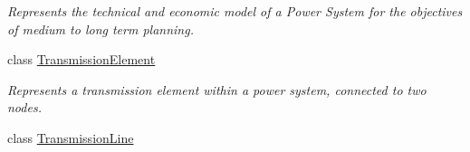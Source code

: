 \begin{DoxyCompactItemize}
\begin{DoxyCompactList}\small\item\em Represents the technical and economic model of a Power System for the objectives of medium to long term planning. \end{DoxyCompactList}\item 
class \hyperlink{class_power_system_planning_1_1_transmission_element}{Transmission\+Element}
\begin{DoxyCompactList}\small\item\em Represents a transmission element within a power system, connected to two nodes. \end{DoxyCompactList}\item 
class \hyperlink{class_power_system_planning_1_1_transmission_line}{Transmission\+Line}
\end{DoxyCompactItemize}
